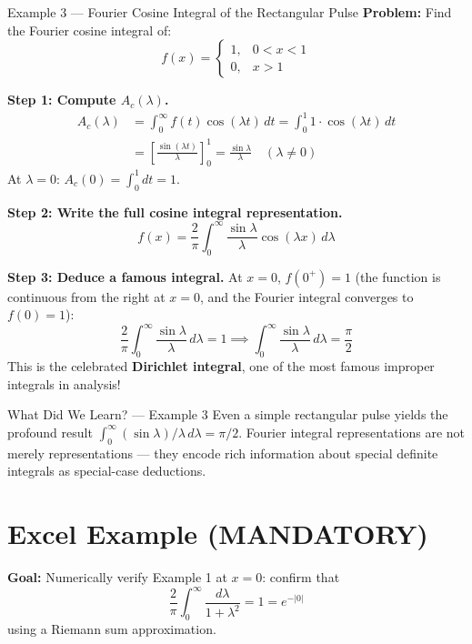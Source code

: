 \documentclass[12pt,a4paper]{article}
\begin{document}
\begin{infobox}{Example 3 --- Fourier Cosine Integral of the Rectangular Pulse}
\textbf{Problem:} Find the Fourier cosine integral of:
\[
f(x) = \begin{cases} 1, & 0 < x < 1 \\ 0, & x > 1 \end{cases}
\]

\textbf{Step 1: Compute $A_c(\lambda)$.}
\begin{align*}
A_c(\lambda) &= \int_0^\infty f(t)\cos(\lambda t)\,dt = \int_0^1 1\cdot\cos(\lambda t)\,dt \\
             &= \left[\frac{\sin(\lambda t)}{\lambda}\right]_0^1 = \frac{\sin\lambda}{\lambda} \quad (\lambda \neq 0)
\end{align*}
At $\lambda=0$: $A_c(0) = \int_0^1 dt = 1$.

\textbf{Step 2: Write the full cosine integral representation.}
\[
f(x) = \frac{2}{\pi}\int_0^\infty \frac{\sin\lambda}{\lambda}\cos(\lambda x)\,d\lambda
\]

\textbf{Step 3: Deduce a famous integral.}
At $x=0$, $f(0^+)=1$ (the function is continuous from the right at $x=0$, and the Fourier integral converges to $f(0)=1$):
\[
\frac{2}{\pi}\int_0^\infty \frac{\sin\lambda}{\lambda}\,d\lambda = 1 \implies \int_0^\infty \frac{\sin\lambda}{\lambda}\,d\lambda = \frac{\pi}{2}
\]
This is the celebrated \textbf{Dirichlet integral}, one of the most famous improper integrals in analysis!
\end{infobox}

\begin{learnbox}{What Did We Learn? --- Example 3}
Even a simple rectangular pulse yields the profound result $\int_0^\infty(\sin\lambda)/\lambda\,d\lambda = \pi/2$. Fourier integral representations are not merely representations --- they encode rich information about special definite integrals as special-case deductions.
\end{learnbox}

\section{Excel Example (MANDATORY)}

\textbf{Goal:} Numerically verify Example 1 at $x=0$: confirm that
\[
\frac{2}{\pi}\int_0^\infty \frac{d\lambda}{1+\lambda^2} = 1 = e^{-|0|}
\]
using a Riemann sum approximation.
\end{document}
